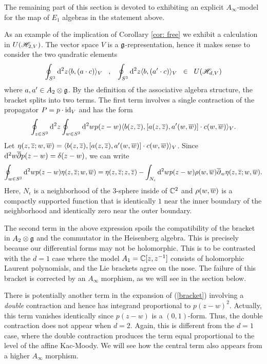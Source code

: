 The remaining part of this section is devoted to exhibiting an explicit $A_\infty$-model for the map of $E_1$ algebras in the statement above.

\begin{eg}\label{eg: contract}
As an example of the implication of Corollary \ref{cor: free} we exhibit a calculation in $U(\mathscr H_{2,V})$. 
The vector space $V$ is a $\mathfrak g$-representation, hence it makes sense to consider the two quadratic elements 
\[
\oint_{S^3} {\rm d}^2 z \langle b, (a \cdot c)\rangle_V \;\;\; , \;\;\; \oint_{S^3} {\rm d}^2 z \langle b, (a'\cdot c)\rangle_V \;\; \in \;\; U (\mathscr H_{d,V})
\]
where $a,a' \in A_2 \otimes \mathfrak g$. 
By the definition of the associative algebra structure, the bracket
\beqn\label{bracket}
\eeqn
splits into two terms.
The first term involves a single contraction of the propagator $P = p \cdot {\rm id}_V$ and has the form
\[
\oint_{z \in S^3} {\rm d}^2 z \oint_{w \in S^3} {\rm d}^2 w p(z-w) \langle b(z,\overline{z}), [a(z,\overline{z}), a'(w,\overline{w})] \cdot c(w,\overline{w})\rangle_V  .
\]
Let $\eta(z,\overline{z};w,\overline{w}) = \langle b(z,\overline{z}), [a(z,\overline{z}), a'(w,\overline{w})] \cdot c(w,\overline{w})\rangle_V$.
Since ${\rm d}^2 w \overline{\partial} p(z-w) = \delta(z-w)$, we can write 
\[
\oint_{w \in S^3} {\rm d}^2 w p(z-w) \eta(z,\overline{z};w,\overline{w}) = \eta(z,\overline{z};z,\overline{z})- \int_{N_{\epsilon}} {\rm d}^2 w p(z-w) \rho(w,\overline{w}) \overline{\partial}_w \eta(z,\overline{z};w,\overline{w}) .
\] 
Here, $N_\epsilon$ is a neighborhood of the $3$-sphere inside of $\mathbb C^2$ and $\rho(w,\overline{w})$ is a compactly supported function that is identically $1$ near the inner boundary of the neighborhood and identically zero near the outer boundary.

The second term in the above expression spoils the compatibility of the bracket in $A_2 \otimes \mathfrak g$ and the commutator in the Heisenberg algebra.
This is precisely because our differential forms may not be holomorphic.
This is to be contrasted with the $d=1$ case where the model $A_1 = \mathbb C[z,z^{-1}]$ consists of holomorphic Laurent polynomials, and the Lie brackets agree on the nose. 
The failure of this bracket is corrected by an $A_\infty$ morphism, as we will see in the section below.

There is potentially another term in the expansion of (\ref{bracket}) involving a {\em double} contraction and hence has integrand proportional to $p(z-w)^2$. 
Actually, this term vanishes identically since $p(z-w)$ is a $(0,1)$-form. 
Thus, the double contraction does not appear when $d=2$.
Again, this is different from the $d=1$ case, where the double contraction produces the term equal proportional to the level of the affine Kac-Moody. 
We will see how the central term also appears from a higher $A_\infty$ morphism. 
\end{eg}

